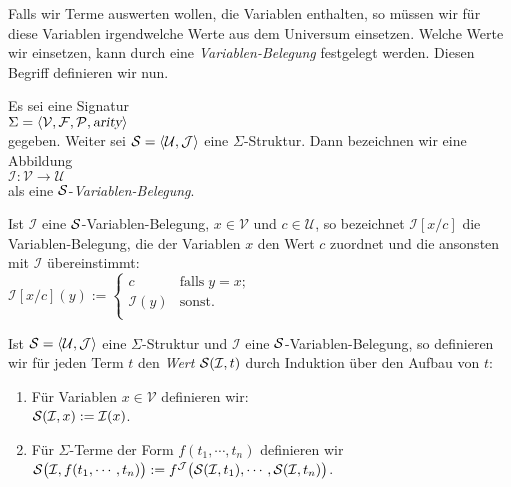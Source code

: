 Falls wir Terme auswerten wollen, die Variablen enthalten, so m\"{u}ssen wir f\"{u}r diese
Variablen irgendwelche Werte aus dem Universum einsetzen.  Welche Werte wir einsetzen, kann
durch eine {\emph{\color{blue}Variablen-Belegung}} festgelegt werden.  Diesen Begriff definieren wir
nun.

\begin{Definition}
    Es sei eine  Signatur \\[0.2cm]
    \hspace*{1.3cm} $\Sigma = \langle \mathcal{V}, \mathcal{F}, \mathcal{P}, \textsl{arity} \rangle$ \\[0.2cm]
    gegeben.  Weiter sei $\mathcal{S} = \langle \mathcal{U}, \mathcal{J} \rangle$ eine $\Sigma$-Struktur.  Dann bezeichnen wir 
     eine Abbildung \\[0.2cm]
    \hspace*{1.3cm} $\mathcal{I}: \mathcal{V} \rightarrow \mathcal{U}$ \\[0.2cm]
    als eine {\color{blue}$\mathcal{S}$-\emph{Variablen-Belegung}}.

    Ist $\mathcal{I}$ eine $\mathcal{S}$-Variablen-Belegung,
    $x \in \mathcal{V}$ und $c \in \mathcal{U}$, so bezeichnet $\mathcal{I}[x/c]$ die Variablen-Belegung, die 
    der Variablen $x$ den Wert $c$ zuordnet und die ansonsten mit $\mathcal{I}$ \"{u}bereinstimmt: \\[0.2cm]
    \hspace*{1.3cm} 
    $\mathcal{I}[x/c](y) := \left\{
    \begin{array}{ll}
    c               & \mbox{falls}\; y = x;  \\
    \mathcal{I}(y)  & \mbox{sonst}.          \\
    \end{array}
    \right.$ \eox
\end{Definition}
\pagebreak

\begin{Definition}
    Ist $\struct = \pair(\mathcal{U},\mathcal{J})$ eine $\Sigma$-Struktur und $\mathcal{I}$ eine $\mathcal{S}$-Variablen-Belegung,
    so definieren wir f\"{u}r jeden Term $t$ den {\emph{\color{blue}Wert}} $\mathcal{S}(\mathcal{I}, t)$ durch Induktion \"{u}ber den Aufbau
    von $t$:
    \begin{enumerate}
    \item F\"{u}r Variablen $x \in \mathcal{V}$ definieren wir: \\[0.2cm]
          \hspace*{1.3cm} $\mathcal{S}(\mathcal{I}, x) := \mathcal{I}(x)$.
    \item F\"{u}r $\Sigma$-Terme der Form $f(t_1,\cdots,t_n)$ definieren wir \\[0.2cm]
          \hspace*{1.3cm} $\mathcal{S}\bigl(\mathcal{I}, f(t_1,\cdots,t_n)\bigr) := 
                           f^\mathcal{J}\bigl( \mathcal{S}(\mathcal{I}, t_1), \cdots, \mathcal{S}(\mathcal{I}, t_n) \bigr)$.
                           \eox
    \end{enumerate}
\end{Definition}

